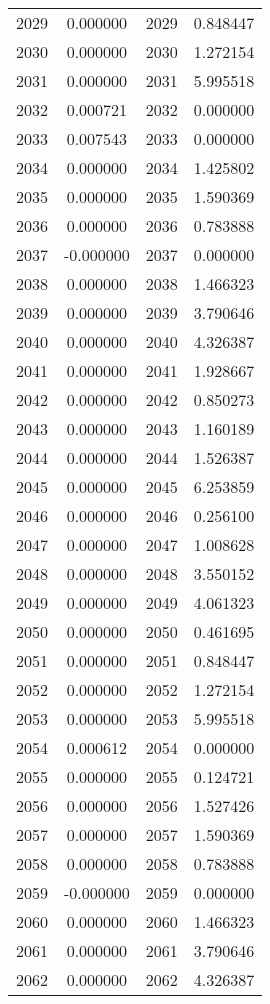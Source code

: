 \documentclass[12pt]{article}
\begin{document}
\begin{longtable}{@{}cccc@{}}
2029 & 0.000000 & 2029 & 0.848447 \\
2030 & 0.000000 & 2030 & 1.272154 \\
2031 & 0.000000 & 2031 & 5.995518 \\
2032 & 0.000721 & 2032 & 0.000000 \\
2033 & 0.007543 & 2033 & 0.000000 \\
2034 & 0.000000 & 2034 & 1.425802 \\
2035 & 0.000000 & 2035 & 1.590369 \\
2036 & 0.000000 & 2036 & 0.783888 \\
2037 & -0.000000 & 2037 & 0.000000 \\
2038 & 0.000000 & 2038 & 1.466323 \\
2039 & 0.000000 & 2039 & 3.790646 \\
2040 & 0.000000 & 2040 & 4.326387 \\
2041 & 0.000000 & 2041 & 1.928667 \\
2042 & 0.000000 & 2042 & 0.850273 \\
2043 & 0.000000 & 2043 & 1.160189 \\
2044 & 0.000000 & 2044 & 1.526387 \\
2045 & 0.000000 & 2045 & 6.253859 \\
2046 & 0.000000 & 2046 & 0.256100 \\
2047 & 0.000000 & 2047 & 1.008628 \\
2048 & 0.000000 & 2048 & 3.550152 \\
2049 & 0.000000 & 2049 & 4.061323 \\
2050 & 0.000000 & 2050 & 0.461695 \\
2051 & 0.000000 & 2051 & 0.848447 \\
2052 & 0.000000 & 2052 & 1.272154 \\
2053 & 0.000000 & 2053 & 5.995518 \\
2054 & 0.000612 & 2054 & 0.000000 \\
2055 & 0.000000 & 2055 & 0.124721 \\
2056 & 0.000000 & 2056 & 1.527426 \\
2057 & 0.000000 & 2057 & 1.590369 \\
2058 & 0.000000 & 2058 & 0.783888 \\
2059 & -0.000000 & 2059 & 0.000000 \\
2060 & 0.000000 & 2060 & 1.466323 \\
2061 & 0.000000 & 2061 & 3.790646 \\
2062 & 0.000000 & 2062 & 4.326387 \\

\end{longtable}
\end{document}
